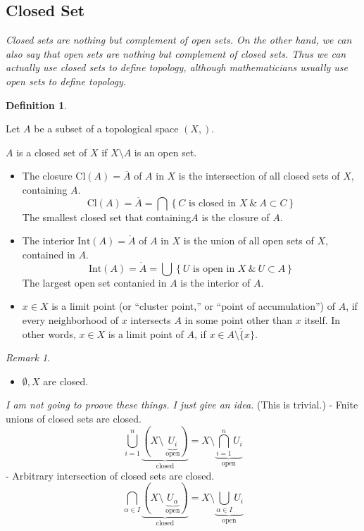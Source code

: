 \documentclass[
]{book}
\providecommand{\tightlist}{%
  \setlength{\itemsep}{0pt}\setlength{\parskip}{0pt}}
\theoremstyle{definition}
\newtheorem{definition}{Definition}[chapter]
\theoremstyle{definition}
\theoremstyle{definition}
\theoremstyle{definition}
\theoremstyle{remark}
\newtheorem*{remark}{Remark}
\begin{document}
\hypertarget{closed-set}{%
\subsection{Closed Set}\label{closed-set}}

\emph{Closed sets are nothing but complement of open sets. On the other hand, we can also say that open sets are nothing but complement of closed sets. Thus we can actually use closed sets to define topology, although mathematicians usually use open sets to define topology.}

\begin{definition}
\protect\hypertarget{def:unnamed-chunk-50}{}\label{def:unnamed-chunk-50}

Let \(A\) be a subset of a topological space \((X, \mathcal{})\).

\(A\) is a closed set of \(X\) if \(X\setminus A\) is an open set.

\begin{itemize}
\tightlist
\item
  The closure Cl\((A)=\overline{A}\) of \(A\) in \(X\) is the intersection of all closed sets of \(X\), containing \(A\).
  \[\text{Cl}(A)=\overline{A}=\bigcap \left\{C \text{ is closed in } X~ \&~  A \subset C\right\}\]
  The smallest closed set that containing\(A\) is the closure of \(A\).
\item
  The interior \(\text{Int}(A)=\mathring{A}\) of \(A\) in \(X\) is the union of all open sets of \(X\), contained in \(A\).
  \[\text{Int}(A)=\mathring{A}=\bigcup \left\{U \text{ is open in } X~ \&~  U \subset A\right\}\]
  The largest open set contanied in \(A\) is the interior of \(A\).
\item
  \(x \in X\) is a limit point (or ``cluster point,'' or ``point of accumulation'') of \(A\),
  if every neighborhood
  of \(x\) intersects \(A\) in some point other than \(x\) itself. In other words, \(x \in X\) is a limit point of \(A\), if \(x \in \overline{A\setminus\{x\}}\).
\end{itemize}

\end{definition}

\begin{remark}
\leavevmode

\begin{itemize}
\tightlist
\item
  \(\emptyset, X\) are closed.
\end{itemize}

\emph{I am not going to proove these things. I just give an idea.}
(This is trivial.)
- Fnite unions of closed sets are closed.
\[  \bigcup_{i=1}^n
    \underbrace{(X\setminus~ \underbrace{U_i}_{\text{open}})}_{\text{closed}}
    =X\setminus \underbrace{\bigcap_{i=1}^nU_i}_{\text{open}}\]
- Arbitrary intersection of closed sets are closed.
\[  \bigcap_{\alpha\in I}
    \underbrace{(X\setminus~ \underbrace{U_\alpha}_{\text{open}})}_{\text{closed}}
    =X\setminus \underbrace{\bigcup_{\alpha \in I} U_i}_{\text{open}}\]

\end{remark}
\end{document}
